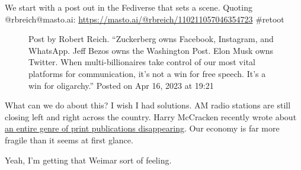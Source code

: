 We start with a post out in the Fediverse that sets a scene. Quoting
@rbreich@masto.ai: \url{https://masto.ai/@rbreich/110211057046354723}
\#retoot

\begin{figure}
\centering
{}
\caption{Post by Robert Reich. ``Zuckerberg owns Facebook, Instagram,
and WhatsApp. Jeff Bezos owns the Washington Post. Elon Musk owns
Twitter. When multi-billionaires take control of our most vital
platforms for communication, it's not a win for free speech. It's a win
for oligarchy.'' Posted on Apr 16, 2023 at 19:21}
\end{figure}

What can we do about this? I wish I had solutions. AM radio stations are
still closing left and right across the country. Harry McCracken
recently wrote about
\href{https://web.archive.org/web/20230416142822/https://www.technologizer.com/2023/04/15/the-end-of-computer-magazines-in-america/}{an
entire genre of print publications disappearing}. Our economy is far
more fragile than it seems at first glance.

Yeah, I'm getting that Weimar sort of feeling.
